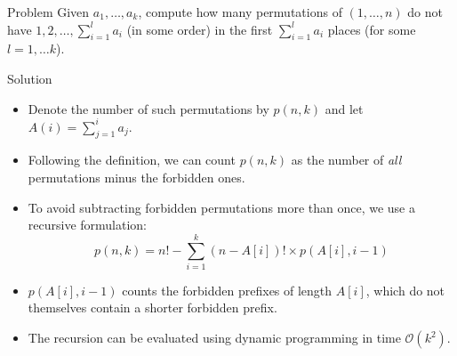 \begin{frame}

  \frametitle{\problemtitle}

  \begin{block}{Problem}
    Given $a_1, \dots, a_k$, compute how many permutations of $(1,
    \dots, n)$ do not have
    $1, 2, \dots, \sum_{i=1}^l a_i$ (in some order) in the first
    $\sum_{i=1}^l a_i$ places (for some $l=1, \dots k$). 
  \end{block}
  \pause
	\begin{block}{Solution}

		\begin{itemize}
      \item<+-> Denote the number of such permutations by $p(n,k)$ and let
        $A(i) = \sum_{j=1}^i a_j$.
      \item<+-> Following the definition, we can count $p(n,k)$ as the
        number of \emph{all} permutations minus the forbidden ones.
      \item<+-> To avoid subtracting forbidden permutations more
        than once, we use a recursive formulation:
        \[
          p(n, k) = n! - \sum_{i=1}^k (n-A[i])! \times p(A[i], i-1)
        \]
      \item<+-> $p(A[i], i-1)$ counts the forbidden prefixes of length
        $A[i]$, which do not themselves contain a shorter forbidden
        prefix.
      \item<+-> The recursion can be evaluated using dynamic programming
        in time $\mathcal{O}(k^2)$.
		\end{itemize}

	\end{block}

\end{frame}
